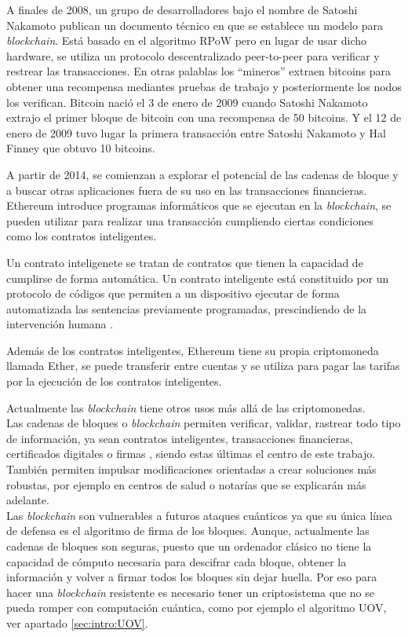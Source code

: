 A finales de 2008, un grupo de desarrolladores bajo el nombre de Satoshi Nakamoto publican un documento técnico en que se establece un modelo para \textit{blockchain}. Está basado en el algoritmo RPoW pero en lugar de usar dicho hardware, se utiliza un protocolo descentralizado peer-to-peer para verificar y restrear las transacciones. En otras palablas los ``mineros'' extraen bitcoins para obtener una recompensa mediantes pruebas de trabajo y posteriormente los nodos los verifican. Bitcoin nació el 3 de enero de 2009 cuando Satoshi Nakamoto extrajo el primer bloque de bitcoin con una recompensa de 50 bitcoins. Y el 12 de enero de 2009 tuvo lugar la primera transacción entre Satoshi Nakamoto y Hal Finney que obtuvo 10 bitcoins.

A partir de 2014, se comienzan a explorar el potencial de las cadenas de bloque y a buscar otras aplicaciones fuera de su uso en las transacciones financieras.
Ethereum introduce programas informáticos que se ejecutan en la \textit{blockchain}, se pueden utilizar para realizar una transacción cumpliendo ciertas condiciones como los contratos inteligentes.

Un contrato inteligenete se tratan de contratos que tienen la capacidad de cumplirse de forma automática. Un contrato inteligente está constituido por un protocolo de códigos que permiten a un dispositivo ejecutar de forma automatizada las sentencias previamente programadas, prescindiendo de la intervención humana \cite{contrato-inteligente}.

Además de los contratos inteligentes, Ethereum tiene su propia criptomoneda llamada Ether, se puede transferir entre cuentas y se utiliza para pagar las tarifas por la ejecución de los contratos inteligentes.

Actualmente las \textit{blockchain} tiene otros usos más allá de las criptomonedas.\\


Las cadenas de bloques o \textit{blockchain} permiten verificar, validar, rastrear todo tipo de información, ya sean contratos inteligentes, transacciones financieras, certificados digitales o firmas \cite{blockchain}, siendo estas últimas el centro de este trabajo. También permiten impulsar modificaciones orientadas a crear soluciones más robustas, por ejemplo en centros de salud o notarías que se explicarán más adelante.\\

Las \textit{blockchain} son vulnerables a futuros ataques cuánticos ya que su única línea de defensa es el algoritmo de firma de los bloques. Aunque, actualmente las cadenas de bloques son seguras, puesto que un ordenador clásico no tiene la capacidad de cómputo necesaria para descifrar cada bloque, obtener la información y volver a firmar todos los bloques sin dejar huella. Por eso para hacer una \textit{blockchain} resistente es necesario tener un criptosistema que no se pueda romper con computación cuántica, como por ejemplo el algoritmo UOV, ver apartado \ref{sec:intro:UOV}. \\

